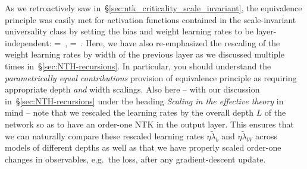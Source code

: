 As we retroactively saw in~\S\ref{sec:ntk_criticality_scale_invariant}, the equivalence principle was easily met for activation functions contained in the scale-invariant universality class 
by setting the bias and weight learning rates to be layer-independent:
\be\label{eq:super-scale-invariant}
\eta\Lb{\ell}=\, , \qquad {}=\, .
\ee
Here, we have also re-emphasized the rescaling of the weight learning rates by width of the previous layer as we discussed multiple times in~\S\ref{sec:NTH-recursions}. In particular, you should understand the \emph{parametrically equal contributions} provision of equivalence principle as requiring appropriate depth \emph{and} width scalings.
Also here -- with our discussion in~\S\ref{sec:NTH-recursions} under the heading \emph{Scaling in the effective theory} in mind -- note that we rescaled the learning rates by the overall depth $L$ of the network so as to have an order-one NTK in the output layer.
This ensures that we can naturally compare these rescaled learning rates $\eta\widetilde{\lambda}_b$ and $\eta\widetilde{\lambda}_W$ across models of different depths as well as that we have properly scaled order-one changes in observables, e.g.~the loss, after any gradient-descent update.




